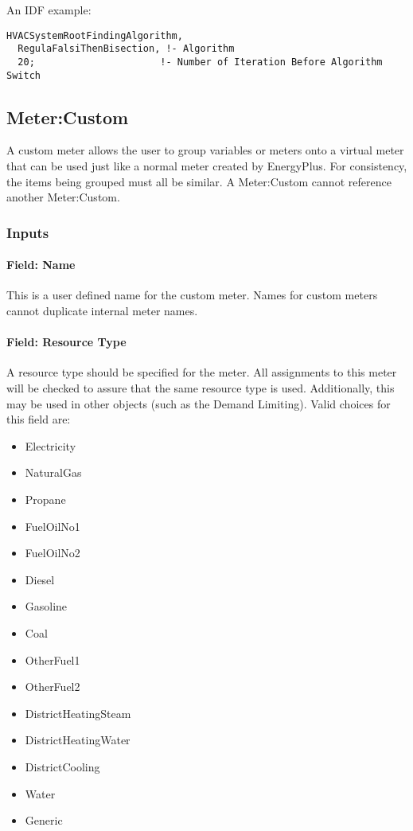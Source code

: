 An IDF example:

\begin{lstlisting}
HVACSystemRootFindingAlgorithm,
  RegulaFalsiThenBisection, !- Algorithm
  20;                      !- Number of Iteration Before Algorithm Switch
\end{lstlisting}

\subsection{Meter:Custom}\label{metercustom}

A custom meter allows the user to group variables or meters onto a virtual meter that can be used just like a normal meter created by EnergyPlus. For consistency, the items being grouped must all be similar. A Meter:Custom cannot reference another Meter:Custom.

\subsubsection{Inputs}\label{inputs-17-008}

\paragraph{Field: Name}\label{field-name-043}

This is a user defined name for the custom meter. Names for custom meters cannot duplicate internal meter names.

\paragraph{Field: Resource Type}\label{field-fuel-type-004}

A resource type should be specified for the meter. All assignments to this meter will be checked to assure that the same resource type is used. Additionally, this may be used in other objects (such as the Demand Limiting). Valid choices for this field are:

\begin{itemize}
    \item
    Electricity
    \item
    NaturalGas
    \item
    Propane
    \item
    FuelOilNo1
    \item
    FuelOilNo2
    \item
    Diesel
    \item
    Gasoline
    \item
    Coal
    \item
    OtherFuel1
    \item
    OtherFuel2
    \item
    DistrictHeatingSteam
    \item
    DistrictHeatingWater
    \item
    DistrictCooling
    \item
    Water
    \item
    Generic
\end{itemize}

